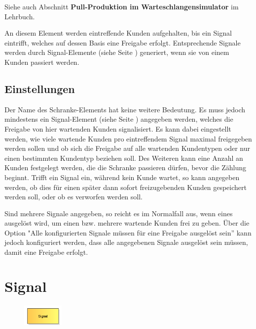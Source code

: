 Siehe auch Abschnitt \textbf{Pull-Produktion im Warteschlangensimulator} im Lehrbuch.

An diesem Element werden eintreffende Kunden aufgehalten, bis ein Signal eintrifft, welches auf dessen Basis
eine Freigabe erfolgt. Entsprechende Signale werden durch Signal-Elemente (siehe Seite \pageref{ref:ModelElementSignal}) 
generiert, wenn sie von einem Kunden passiert werden.

\subsection*{Einstellungen}

Der Name des Schranke-Elements hat keine weitere Bedeutung. Es muss jedoch mindestens ein
Signal-Element (siehe Seite \pageref{ref:ModelElementSignal}) angegeben werden, welches die Freigabe
von hier wartenden Kunden signalisiert. Es kann dabei eingestellt werden,
wie viele wartende Kunden pro eintreffendem Signal maximal freigegeben werden sollen und ob sich
die Freigabe auf alle wartenden Kundentypen oder nur einen bestimmten Kundentyp beziehen soll.
Des Weiteren kann eine Anzahl an Kunden festgelegt werden, die die Schranke passieren dürfen,
bevor die Zählung beginnt. Trifft ein Signal ein, während kein Kunde wartet, so kann angegeben
werden, ob dies für einen später dann sofort freizugebenden Kunden gespeichert werden soll,
oder ob es verworfen werden soll.

Sind mehrere Signale angegeben, so reicht es im Normalfall aus, wenn eines ausgelöst wird,
um einen bzw. mehrere wartende Kunden frei zu geben. Über die Option
"Alle konfigurierten Signale müssen für eine Freigabe ausgelöst sein'' kann jedoch konfiguriert
werden, dass alle angegebenen Signale ausgelöst sein müssen, damit eine Freigabe erfolgt.


\section{Signal}
\label{ref:ModelElementSignal}

\begin{figure}
\vspace{-22pt}
\includegraphics[width=2cm]{imageModelElementSignal.png}
\vspace{-22pt}
\end{figure}

